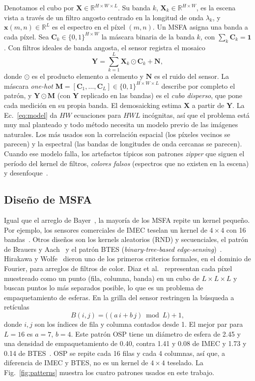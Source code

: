 \documentclass{article}
\def\X{{\mathbf X}}
\def\Y{{\mathbf Y}}
\def\C{{\mathbf C}}
\def\M{{\mathbf M}}
\def\N{{\mathbf N}}
\def\x{{\mathbf x}}
\begin{document}
Denotamos el cubo por $\X\in\mathbb{R}^{H\times W\times L}$. Su banda $k$,
$\X_k\in\mathbb{R}^{H\times W}$, es la escena vista a través de un filtro
angosto centrado en la longitud de onda $\lambda_k$, y
$\x(m,n)\in\mathbb{R}^L$ es el espectro en el píxel $(m,n)$. Un MSFA asigna
una banda a cada píxel. Sea $\C_k\in\{0,1\}^{H\times W}$ la máscara binaria
de la banda $k$, con $\sum_k\C_k=\mathbf{1}$. Con filtros ideales de banda
angosta, el sensor registra el mosaico~\cite{diaz2023}
\begin{equation}
  \Y = \sum_{k=1}^{L} \X_k \odot \C_k + \N,
  \label{eq:model}
\end{equation}
donde $\odot$ es el producto elemento a elemento y $\N$ es el ruido del
sensor. La máscara \emph{one-hot}
$\M=[\C_1,\dots,\C_L]\in\{0,1\}^{H\times W\times L}$ describe por completo
el patrón, y $\Y\odot\M$ (con $\Y$ replicado en las bandas) es el
\emph{cubo disperso}, que pone cada medición en su propia banda. El
demosaicking estima $\X$ a partir de $\Y$. La Ec.~\eqref{eq:model} da $HW$
ecuaciones para $HWL$ incógnitas, así que el problema está muy mal planteado
y todo método necesita un modelo previo de las imágenes naturales. Los más
usados son la correlación espacial (los píxeles vecinos se parecen) y la
espectral (las bandas de longitudes de onda cercanas se parecen). Cuando ese
modelo falla, los artefactos típicos son patrones \emph{zipper} que siguen
el período del kernel de filtros, \emph{colores falsos} (espectros que no
existen en la escena) y desenfoque~\cite{diaz2023}.

\subsection{Diseño de MSFA}

Igual que el arreglo de Bayer~\cite{bayer1976}, la mayoría de los MSFA
repite un kernel pequeño. Por ejemplo, los sensores comerciales de IMEC
teselan un kernel de $4\times4$ con 16 bandas~\cite{geelen2014}. Otros
diseños son los kernels aleatorios (RND) y secuenciales, el patrón de
Brauers y Aach~\cite{brauers2006} y el patrón BTES (\emph{binary-tree-based
edge-sensing})~\cite{miao2006}. Hirakawa y Wolfe~\cite{hirakawa2008} dieron
uno de los primeros criterios formales, en el dominio de Fourier, para
arreglos de filtros de color. Diaz et al.~\cite{diaz2023} representan cada
píxel muestreado como un punto (fila, columna, banda) en un cubo de
$L\times L\times L$ y buscan puntos lo más separados posible, lo que es un
problema de empaquetamiento de esferas. En la grilla del sensor restringen
la búsqueda a retículas
\begin{equation}
  B(i,j) = \big((a\,i + b\,j)\bmod L\big) + 1,
  \label{eq:osp}
\end{equation}
donde $i,j$ son los índices de fila y columna contados desde 1. El mejor par
para $L=16$ es $a=7$, $b=4$. Este patrón OSP tiene un diámetro de esfera de
2.45 y una densidad de empaquetamiento de 0.40, contra 1.41 y 0.08 de IMEC
y 1.73 y 0.14 de BTES~\cite{diaz2023}. OSP se repite cada 16 filas y cada 4
columnas, así que, a diferencia de IMEC y BTES, no es un kernel de
$4\times4$ teselado. La Fig.~\ref{fig:patterns} muestra los cuatro patrones
usados en este trabajo.
\end{document}
